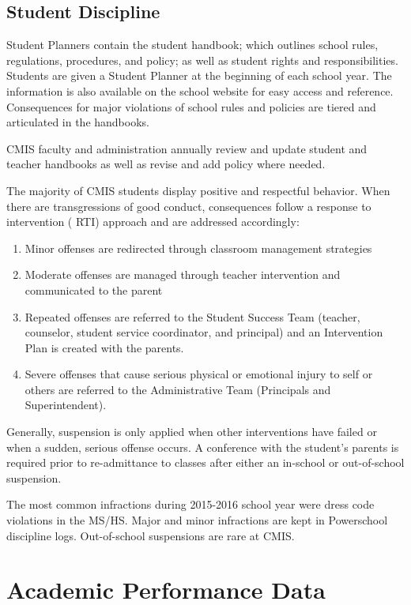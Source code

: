 \subsection{Student Discipline}
Student Planners contain the student handbook; which outlines school rules, regulations, procedures, and policy; as well as student rights and responsibilities.  Students are given a Student Planner at the beginning of each school year.  The information is also available on the school website for easy access and reference.  Consequences for major violations of school rules and policies are tiered and articulated in the handbooks. 

CMIS faculty and administration annually review and update student and teacher handbooks as well as revise and add policy where needed. 

The majority of CMIS students display positive and respectful behavior. When there are transgressions of good conduct, consequences follow a response to intervention ( RTI) approach and are addressed accordingly:

\begin{enumerate}
\item Minor offenses are redirected through classroom management strategies 
\item Moderate offenses are managed through teacher intervention and communicated to the parent
\item Repeated offenses are referred to the Student Success Team (teacher, counselor, student service coordinator, and principal) and an Intervention Plan is created with the parents. 
\item Severe offenses that cause serious physical or emotional injury to self or others are referred to the Administrative Team (Principals and Superintendent). 
\end{enumerate}

Generally, suspension is only applied when other interventions have failed or when a sudden, serious offense occurs. A conference with the student’s parents is required prior to re-admittance to classes after either an in-school or out-of-school suspension. 

The most common infractions during 2015-2016 school year were dress code violations in the MS/HS.  Major and minor infractions are kept in Powerschool discipline logs. Out-of-school suspensions are rare at CMIS.

\section{Academic Performance Data}

